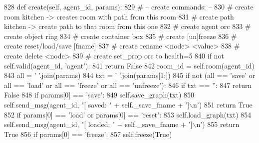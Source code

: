 \begin{DoxyCode}
828     \textcolor{keyword}{def }create(self, agent\_id, params):
829         \textcolor{comment}{# -- create commands: --}
830         \textcolor{comment}{# create room kitchen  -> creates room with path from this room}
831         \textcolor{comment}{# create path kitchen  -> create path to that room from this one}
832         \textcolor{comment}{# create agent orc}
833         \textcolor{comment}{# create object ring}
834         \textcolor{comment}{# create container box}
835         \textcolor{comment}{# create [un]freeze}
836         \textcolor{comment}{# create reset/load/save [fname]}
837         \textcolor{comment}{# create rename <node> <value>}
838         \textcolor{comment}{# create delete <node>}
839         \textcolor{comment}{# create set\_prop orc to health=5}
840         \textcolor{keywordflow}{if} \textcolor{keywordflow}{not} self.valid(agent\_id, \textcolor{stringliteral}{'agent'}):
841             \textcolor{keywordflow}{return} \textcolor{keyword}{False}
842         room\_id = self.room(agent\_id)
843         all = \textcolor{stringliteral}{' '}.join(params)
844         txt = \textcolor{stringliteral}{' '}.join(params[1:])
845         \textcolor{keywordflow}{if} \textcolor{keywordflow}{not} (all == \textcolor{stringliteral}{'save'} \textcolor{keywordflow}{or} all == \textcolor{stringliteral}{'load'} \textcolor{keywordflow}{or} all == \textcolor{stringliteral}{'freeze'} \textcolor{keywordflow}{or} all == \textcolor{stringliteral}{'unfreeze'}):
846             \textcolor{keywordflow}{if} txt == \textcolor{stringliteral}{''}:
847                 \textcolor{keywordflow}{return} \textcolor{keyword}{False}
848         \textcolor{keywordflow}{if} params[0] == \textcolor{stringliteral}{'save'}:
849             self.save\_graph(txt)
850             self.send\_msg(agent\_id, \textcolor{stringliteral}{"[ saved: "} + self.\_save\_fname + \textcolor{stringliteral}{']\(\backslash\)n'})
851             \textcolor{keywordflow}{return} \textcolor{keyword}{True}
852         \textcolor{keywordflow}{if} params[0] == \textcolor{stringliteral}{'load'} \textcolor{keywordflow}{or} params[0] == \textcolor{stringliteral}{'reset'}:
853             self.load\_graph(txt)
854             self.send\_msg(agent\_id, \textcolor{stringliteral}{"[ loaded: "} + self.\_save\_fname + \textcolor{stringliteral}{']\(\backslash\)n'})
855             \textcolor{keywordflow}{return} \textcolor{keyword}{True}
856         \textcolor{keywordflow}{if} params[0] == \textcolor{stringliteral}{'freeze'}:
857             self.freeze(\textcolor{keyword}{True})

\end{DoxyCode}
